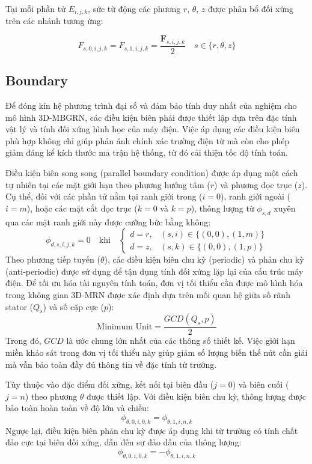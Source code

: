 Tại mỗi phần tử $E_{i,j,k}$, sức từ động các phương $r$, $\theta$, $z$ được phân bổ đối xứng trên các nhánh tương ứng:

\begin{equation}
F_{s,0,i,j,k} = F_{s,1,i,j,k} = \frac{\mathbf{F}_{s,i,j,k}}{2}  \quad s \in \{r, \theta, z\}
\end{equation}

\subsection{Boundary}

Để đóng kín hệ phương trình đại số và đảm bảo tính duy nhất của nghiệm cho mô hình 3D-MBGRN, các điều kiện biên phải được thiết lập dựa trên đặc tính vật lý và tính đối xứng hình học của máy điện. Việc áp dụng các điều kiện biên phù hợp không chỉ giúp phản ánh chính xác trường điện từ mà còn cho phép giảm đáng kể kích thước ma trận hệ thống, từ đó cải thiện tốc độ tính toán.

Điều kiện biên song song (parallel boundary condition) được áp dụng một cách tự nhiên tại các mặt giới hạn theo phương hướng tâm ($r$) và phương dọc trục ($z$). Cụ thể, đối với các phần tử nằm tại ranh giới trong ($i=0$), ranh giới ngoài ($i=m$), hoặc các mặt cắt dọc trục ($k=0$ và $k=p$), thông lượng từ $\phi_{s,d}$ xuyên qua các mặt ranh giới này được cưỡng bức bằng không:
\begin{equation}
\phi_{d, s, i, j, k} = 0 \quad \text{khi} \quad
\begin{cases} 
d = r, & (s, i) \in \{(0, 0), (1, m)\} \\ 
d = z, & (s, k) \in \{(0, 0), (1, p)\} 
\end{cases}
\end{equation}
Theo phương tiếp tuyến ($\theta$), các điều kiện biên chu kỳ (periodic) và phản chu kỳ (anti-periodic) được sử dụng để tận dụng tính đối xứng lặp lại của cấu trúc máy điện. Để tối ưu hóa tài nguyên tính toán, đơn vị tối thiểu cần được mô hình hóa trong không gian 3D-MRN được xác định dựa trên mối quan hệ giữa số rãnh stator ($Q_s$) và số cặp cực ($p$):
\begin{equation}
    \text{Minimum Unit} = \frac{GCD(Q_s, p)}{2}
\end{equation}
Trong đó, $GCD$ là ước chung lớn nhất của các thông số thiết kế. Việc giới hạn miền khảo sát trong đơn vị tối thiểu này giúp giảm số lượng biến thế nút cần giải mà vẫn bảo toàn đầy đủ thông tin về đặc tính từ trường.

Tùy thuộc vào đặc điểm đối xứng, kết nối tại biên đầu ($j=0$) và biên cuối ($j=n$) theo phương $\theta$ được thiết lập. Với điều kiện biên chu kỳ, thông lượng được bảo toàn hoàn toàn về độ lớn và chiều:
\begin{equation}
    \phi_{\theta,0,i,0,k} = \phi_{\theta,1,i,n,k}
\end{equation}
Ngược lại, điều kiện biên phản chu kỳ được áp dụng khi từ trường có tính chất đảo cực tại biên đối xứng, dẫn đến sự đảo dấu của thông lượng:
\begin{equation}
    \phi_{\theta,0,i,0,k} = -\phi_{\theta,1,i,n,k}
\end{equation}

